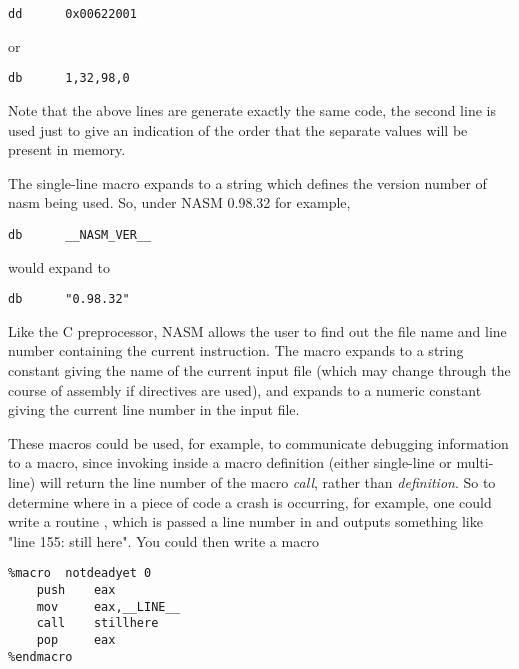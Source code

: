 \begin{lstlisting}
dd      0x00622001
\end{lstlisting}

or

\begin{lstlisting}
db      1,32,98,0
\end{lstlisting}

Note that the above lines are generate exactly the same code, the second
line is used just to give an indication of the order that the separate
values will be present in memory.



The single-line macro  expands to a string which defines
the version number of nasm being used. So, under NASM 0.98.32 for example,

\begin{lstlisting}
db      __NASM_VER__
\end{lstlisting}

would expand to

\begin{lstlisting}
db      "0.98.32"
\end{lstlisting}


Like the C preprocessor, NASM allows the user to find out the file
name and line number containing the current instruction. The macro
 expands to a string constant giving the name of the
current input file (which may change through the course of assembly
if  directives are used), and  expands
to a numeric constant giving the current line number in the input file.

These macros could be used, for example, to communicate debugging
information to a macro, since invoking  inside a macro
definition (either single-line or multi-line) will return the line
number of the macro \emph{call}, rather than \emph{definition}. So to
determine where in a piece of code a crash is occurring, for example,
one could write a routine , which is passed a line number
in  and outputs something like "line 155: still here".
You could then write a macro

\begin{lstlisting}
%macro  notdeadyet 0
    push    eax
    mov     eax,__LINE__
    call    stillhere
    pop     eax
%endmacro
\end{lstlisting}

